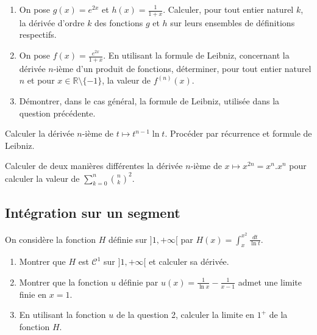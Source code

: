 \begin{exercice}
\begin{enumerate}
    \item On pose $g(x)=e^{2x}$ et $h(x)=\frac{1}{1+x}$.
    Calculer, pour tout entier naturel $k$, la dérivée d'ordre $k$ des fonctions $g$ et $h$ sur leurs ensembles de définitions respectifs.
    \item On pose $f(x)=\frac{e^{2x}}{1+x}$.
    En utilisant la formule de Leibniz, concernant la dérivée $n$-ième d'un produit de fonctions, déterminer, pour tout entier naturel $n$ et pour $x\in\mathbb{R}\setminus\{-1\}$, la valeur de $f^{(n)}(x)$.
    \item Démontrer, dans le cas général, la formule de Leibniz, utilisée dans la question précédente.
\end{enumerate}
\end{exercice}

\begin{exercice}
Calculer la dérivée $n$-ième de $t \mapsto t^{n-1} \ln t$.
Procéder par récurrence et formule de Leibniz.
\end{exercice}

\begin{exercice}
Calculer de deux manières différentes la dérivée $n$-ième de $x\mapsto x^{2n}=x^{n}.x^{n}$ pour calculer la valeur de $\sum_{k=0}^{n}\binom{n}{k}^{2}$.
\end{exercice}

\subsection{Intégration sur un segment}

\begin{exercice}
On considère la fonction $H$ définie sur $]1, +\infty[$ par $H(x)=\int_{x}^{x^{2}}\frac{dt}{\ln t}$.
\begin{enumerate}
    \item Montrer que $H$ est $\mathcal{C}^{1}$ sur $]1,+\infty[$ et calculer sa dérivée.
    \item Montrer que la fonction $u$ définie par $u(x)=\frac{1}{\ln x}-\frac{1}{x-1}$ admet une limite finie en $x=1$.
    \item En utilisant la fonction $u$ de la question 2, calculer la limite en $1^+$ de la fonction $H$.
\end{enumerate}
\end{exercice}


